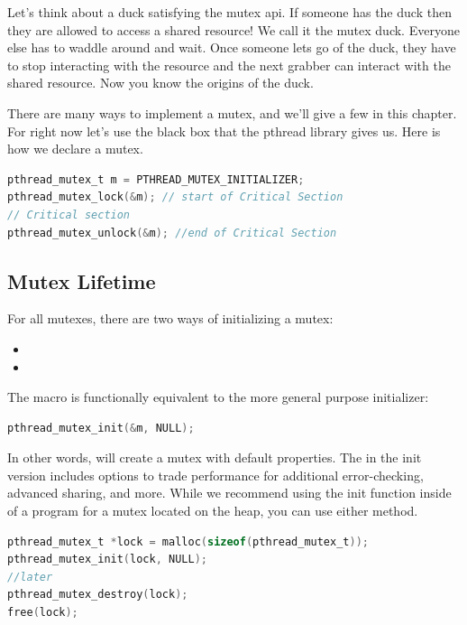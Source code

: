 Let's think about a duck satisfying the mutex api. If someone has the duck then they are allowed to access a shared resource! We call it the mutex duck. Everyone else has to waddle around and wait. Once someone lets go of the duck, they have to stop interacting with the resource and the next grabber can interact with the shared resource. Now you know the origins of the duck.

There are many ways to implement a mutex, and we'll give a few in this chapter.
For right now let's use the black box that the pthread library gives us.
Here is how we declare a mutex.

\begin{lstlisting}[language=C]
pthread_mutex_t m = PTHREAD_MUTEX_INITIALIZER;
pthread_mutex_lock(&m); // start of Critical Section
// Critical section
pthread_mutex_unlock(&m); //end of Critical Section
\end{lstlisting}

\subsection{Mutex Lifetime}

For all mutexes, there are two ways of initializing a mutex:
\begin{itemize}
\item{}
\item{}
\end{itemize}
The macro  is functionally equivalent to the more general purpose initializer:

\begin{lstlisting}[language=C]
pthread_mutex_init(&m, NULL);
\end{lstlisting}

In other words,  will create a mutex with default properties.
The  in the init version includes options to trade performance for additional error-checking, advanced sharing, and more.
While we recommend using the init function inside of a program for a mutex located on the heap, you can use either method.

\begin{lstlisting}[language=C]
pthread_mutex_t *lock = malloc(sizeof(pthread_mutex_t));
pthread_mutex_init(lock, NULL);
//later
pthread_mutex_destroy(lock);
free(lock);
\end{lstlisting}

